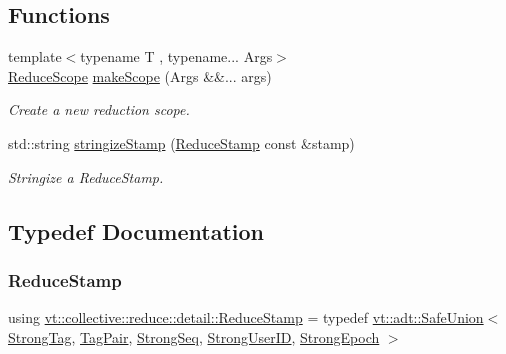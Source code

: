 \subsection*{Functions}
\begin{DoxyCompactItemize}
\item 
{\footnotesize template$<$typename T , typename... Args$>$ }\\\hyperlink{structvt_1_1collective_1_1reduce_1_1detail_1_1_reduce_scope}{Reduce\+Scope} \hyperlink{namespacevt_1_1collective_1_1reduce_1_1detail_addecbceb802231d2689ccc0c4fc8980f}{make\+Scope} (Args \&\&... args)
\begin{DoxyCompactList}\small\item\em Create a new reduction scope. \end{DoxyCompactList}\item 
std\+::string \hyperlink{namespacevt_1_1collective_1_1reduce_1_1detail_a8c155fd8428161395debd8dc0710f583}{stringize\+Stamp} (\hyperlink{namespacevt_1_1collective_1_1reduce_1_1detail_aacc1fcd729d934ba143fee3a943bf9e7}{Reduce\+Stamp} const \&stamp)
\begin{DoxyCompactList}\small\item\em Stringize a {\ttfamily Reduce\+Stamp}. \end{DoxyCompactList}\end{DoxyCompactItemize}


\subsection{Typedef Documentation}
\mbox{\label{namespacevt_1_1collective_1_1reduce_1_1detail_aacc1fcd729d934ba143fee3a943bf9e7}} 
\subsubsection{\texorpdfstring{Reduce\+Stamp}{ReduceStamp}}
{\footnotesize\ttfamily using \hyperlink{namespacevt_1_1collective_1_1reduce_1_1detail_aacc1fcd729d934ba143fee3a943bf9e7}{vt\+::collective\+::reduce\+::detail\+::\+Reduce\+Stamp} = typedef \hyperlink{namespacevt_1_1adt_ad2a7bbcb5f4735ae9d847f96ee62f144}{vt\+::adt\+::\+Safe\+Union}$<$ \hyperlink{namespacevt_1_1collective_1_1reduce_1_1detail_a5e1b708dc12ad0d1209a354ed21ed744}{Strong\+Tag}, \hyperlink{structvt_1_1collective_1_1reduce_1_1detail_1_1_tag_pair}{Tag\+Pair}, \hyperlink{namespacevt_1_1collective_1_1reduce_1_1detail_affec2854d7d65bafb17eb259714e9443}{Strong\+Seq}, \hyperlink{namespacevt_1_1collective_1_1reduce_1_1detail_af9e42b20d1be7dccc1b5e587f0387e02}{Strong\+User\+ID}, \hyperlink{namespacevt_1_1collective_1_1reduce_1_1detail_ad6739d14b8ee41189f785355708748fc}{Strong\+Epoch} $>$}



